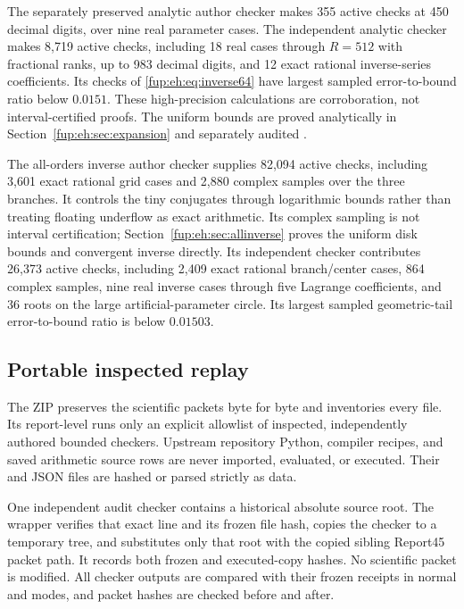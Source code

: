\documentclass[11pt,letterpaper]{article}
\theoremstyle{definition}\newtheorem{definition}[theorem]{Definition}
\theoremstyle{remark}\newtheorem{remark}[theorem]{Remark}
\newcommand{\code}[1]{\texttt{\detokenize{#1}}}
\begin{document}
The separately preserved analytic author checker makes 355 active
checks at 450 decimal digits, over nine real parameter cases. The
independent analytic checker makes 8,719 active checks, including 18
real cases through $R=512$ with fractional ranks, up to 983 decimal
digits, and 12 exact rational inverse-series coefficients. Its
checks of \eqref{fup:eh:eq:inverse64} have largest sampled error-to-bound
ratio below $0.0151$. These high-precision calculations are
corroboration, not interval-certified proofs. The uniform bounds are
proved analytically in Section~\ref{fup:eh:sec:expansion} and separately
audited \cite{fup:eh:expansionaudit}.

The all-orders inverse author checker supplies 82,094 active checks,
including 3,601 exact rational grid cases and 2,880 complex samples
over the three branches. It controls the tiny conjugates through
logarithmic bounds rather than treating floating underflow as exact
arithmetic. Its complex sampling is not interval certification;
Section~\ref{fup:eh:sec:allinverse} proves the uniform disk bounds and
convergent inverse directly.
Its independent checker contributes 26,373 active checks, including
2,409 exact rational branch/center cases, 864 complex samples, nine
real inverse cases through five Lagrange coefficients, and 36 roots
on the large artificial-parameter circle. Its largest sampled
geometric-tail error-to-bound ratio is below $0.01503$.

\subsection{Portable inspected replay}
The ZIP preserves the scientific packets byte for byte and inventories
every file. Its report-level \code{replay.py} runs only an explicit
allowlist of inspected, independently authored bounded checkers.
Upstream repository Python, compiler recipes, and saved arithmetic
source rows are never imported, evaluated, or executed. Their
\code{.py} and JSON files are hashed or parsed strictly as data.

One independent audit checker contains a historical absolute source
root. The wrapper verifies that exact line and its frozen file hash,
copies the checker to a temporary tree, and substitutes only that root
with the copied sibling Report45 packet path. It records both frozen
and executed-copy hashes. No scientific packet is modified. All
checker outputs are compared with their frozen receipts in normal and
\code{python -O} modes, and packet hashes are checked before and after.
\end{document}
